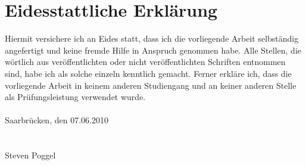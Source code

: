 
\maketitle\thispagestyle{empty}
\setcounter{page}{0}\clearpage

%

\pagestyle{empty}%


\tableofcontents


%



%

%


\chapter*{Eidesstattliche Erklärung}
\label{chap:EidesstattlicheErklaerung}

Hiermit versichere ich an Eides statt, dass ich die vorliegende Arbeit 
selbständig angefertigt und keine fremde Hilfe in Anspruch genommen habe. 
Alle Stellen, die wörtlich aus veröffentlichten oder nicht veröffentlichten 
Schriften entnommen sind, habe ich als solche einzeln kenntlich gemacht. 
Ferner erkläre ich, dass die vorliegende Arbeit in keinem anderen Studiengang und
an keiner anderen Stelle als Prüfungsleistung verwendet wurde.
\textsc{}\\
\textsc{}\\
Saarbrücken, den 07.06.2010 \\
\textsc{}\\
\textsc{}\\
Steven Poggel
